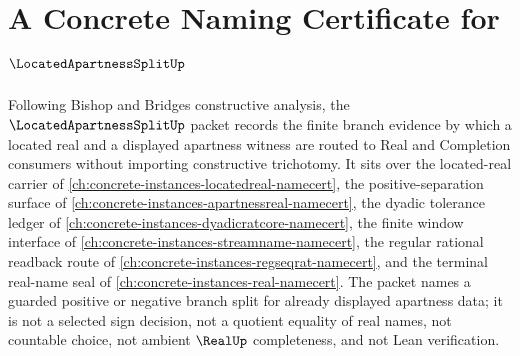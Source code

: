 \chapter{A Concrete Naming Certificate for $\LocatedApartnessSplitUp$}
\label{ch:concrete-instances-located-apartness-split-namecert}

Following Bishop and Bridges constructive analysis, the $\LocatedApartnessSplitUp$ packet records the finite branch evidence by which a located real and a displayed apartness witness are routed to Real and Completion consumers without importing constructive trichotomy. It sits over the located-real carrier of \autoref{ch:concrete-instances-locatedreal-namecert}, the positive-separation surface of \autoref{ch:concrete-instances-apartnessreal-namecert}, the dyadic tolerance ledger of \autoref{ch:concrete-instances-dyadicratcore-namecert}, the finite window interface of \autoref{ch:concrete-instances-streamname-namecert}, the regular rational readback route of \autoref{ch:concrete-instances-regseqrat-namecert}, and the terminal real-name seal of \autoref{ch:concrete-instances-real-namecert}. The packet names a guarded positive or negative branch split for already displayed apartness data; it is not a selected sign decision, not a quotient equality of real names, not countable choice, not ambient $\RealUp$ completeness, and not Lean verification.

